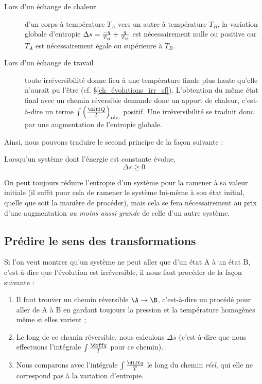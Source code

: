 		\begin{description}
			\item[Lors d’un échange de chaleur] d’un corps à température $T_A$ vers un autre à température $T_B$, la variation globale d’entropie $\Delta s = \frac{-q}{T_\A} + \frac{q}{T_\B }$ est nécessairement nulle ou positive car $T_A$ est nécessairement égale ou supérieure à $T_B$.
			
			\item[Lors d’un échange de travail] toute irréversibilité donne lieu à une température finale plus haute qu’elle n’aurait pu l’être (cf. \S\ref{ch_évolutions_irr_sf}). L’obtention du même état final avec un chemin réversible demande donc un apport de chaleur, c’est-à-dire un terme $\int \left(\frac{\diff Q}{T}\right)_\text{rév.}$ positif. Une irréversibilité se traduit donc par une augmentation de l’entropie globale.
			
		\end{description}

		Ainsi, nous pouvons traduire le second principe de la façon suivante :
			
		\begin{trucimportant}
			Lorsqu’un système dont l’énergie est constante évolue,
				\begin{equation}
					\Delta s \geqslant 0
					\label{eq_augmentation_entropie}
				\end{equation}
		\end{trucimportant}

		On peut toujours réduire l’entropie d’un système pour la ramener à sa valeur initiale (il suffit pour cela de ramener le système lui-même à son état initial, quelle que soit la manière de procéder), mais cela se fera nécessairement au prix d’une augmentation \emph{au moins aussi grande} de celle d’un autre système.

	\subsection{Prédire le sens des transformations}
	
		Si l’on veut montrer qu’un système ne peut aller que d’un état A à un état B, c’est-à-dire que l’évolution est irréversible, il nous faut procéder de la façon suivante :
	
		\begin{enumerate}
			\item Il faut trouver un chemin réversible $\A \to \B$, c’est-à-dire un procédé pour aller de A à B en gardant toujours la pression et la température homogènes même si elles varient ;
			\item Le long de ce chemin réversible, nous calculons $\Delta s$ (c’est-à-dire que nous effectuons l’intégrale $\int \frac{\diff q}{T} $ pour ce chemin).
			\item Nous comparons avec l’intégrale $\int \frac{\diff q}{T} $ le long du chemin \emph{réel}, qui elle ne correspond pas à la variation d’entropie.
		\end{enumerate}

